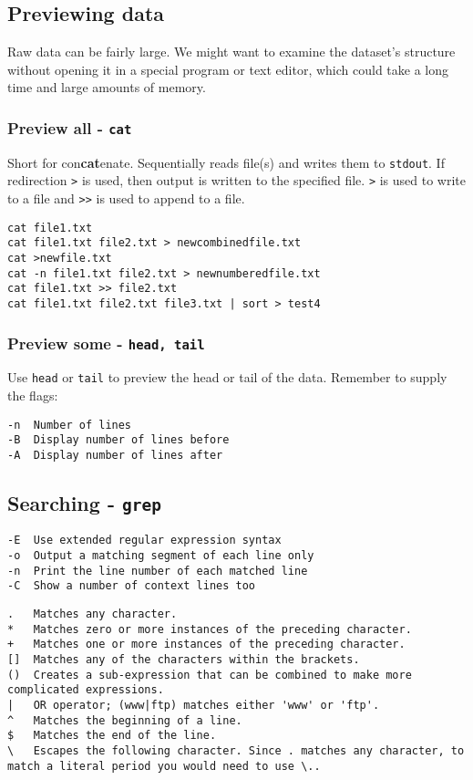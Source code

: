 \documentclass[9pt,twocolumn]{article}
\begin{document}
\subsection*{Previewing data}
Raw data can be fairly large. We might want to examine the dataset's structure without opening it in a special program or text editor, which could take a long time and large amounts of memory.

\subsubsection*{Preview all - \lstinline{cat}}
Short for con\textbf{cat}enate. Sequentially reads file(s) and writes them to \lstinline{stdout}. If redirection \lstinline{>} is used, then output is written to the specified file. \lstinline{>} is used to write to a file and \lstinline{>>} is used to append to a file.
\begin{lstlisting}
cat file1.txt
cat file1.txt file2.txt > newcombinedfile.txt
cat >newfile.txt
cat -n file1.txt file2.txt > newnumberedfile.txt
cat file1.txt >> file2.txt
cat file1.txt file2.txt file3.txt | sort > test4
\end{lstlisting}

\subsubsection*{Preview some - \lstinline{head, tail}}
Use \lstinline{head} or \lstinline{tail} to preview the head or tail of the data. Remember to supply the flags:
\begin{lstlisting}
-n  Number of lines
-B  Display number of lines before
-A  Display number of lines after
\end{lstlisting}

\subsection*{Searching - \lstinline{grep}}
\begin{lstlisting}
-E  Use extended regular expression syntax
-o  Output a matching segment of each line only
-n  Print the line number of each matched line
-C  Show a number of context lines too
\end{lstlisting}


\begin{lstlisting}
.   Matches any character.
*   Matches zero or more instances of the preceding character.
+   Matches one or more instances of the preceding character.
[]  Matches any of the characters within the brackets.
()  Creates a sub-expression that can be combined to make more complicated expressions.
|   OR operator; (www|ftp) matches either 'www' or 'ftp'.
^   Matches the beginning of a line.
$   Matches the end of the line.
\   Escapes the following character. Since . matches any character, to match a literal period you would need to use \..
\end{lstlisting}
\end{document}
